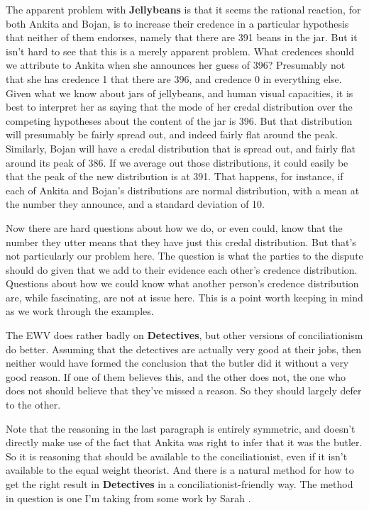 The apparent problem with \textbf{Jellybeans} is that it seems the rational reaction, for both \gls{Ankita} and \gls{Bojan}, is to increase their credence in a particular hypothesis that neither of them endorses, namely that there are 391 beans in the jar. But it isn't hard to see that this is a merely apparent problem. What credences should we attribute to \gls{Ankita} when she announces her guess of 396? Presumably not that she has credence 1 that there are 396, and credence 0 in everything else. Given what we know about jars of jellybeans, and human visual capacities, it is best to interpret her as saying that the mode of her credal distribution over the competing hypotheses about the content of the jar is 396. But that distribution will presumably be fairly spread out, and indeed fairly flat around the peak. Similarly, \gls{Bojan} will have a credal distribution that is spread out, and fairly flat around its peak of 386. If we average out those distributions, it could easily be that the peak of the new distribution is at 391. That happens, for instance, if each of \gls{Ankita} and \gls{Bojan}'s distributions are normal distribution, with a mean at the number they announce, and a standard deviation of 10.

Now there are hard questions about how we do, or even could, know that the number they utter means that they have just this credal distribution. But that's not particularly our problem here. The question is what the parties to the dispute should do given that we add to their evidence each other's credence distribution. Questions about how we could know what another person's credence distribution are, while fascinating, are not at issue here. This is a point worth keeping in mind as we work through the examples.

The EWV does rather badly on \textbf{Detectives}, but other versions of conciliationism do better. Assuming that the detectives are actually very good at their jobs, then neither would have formed the conclusion that the butler did it without a very good reason. If one of them believes this, and the other does not, the one who does not should believe that they've missed a reason. So they should largely defer to the other.

Note that the reasoning in the last paragraph is entirely symmetric, and doesn't directly make use of the fact that \gls{Ankita} was right to infer that it was the butler. So it is reasoning that should be available to the conciliationist, even if it isn't available to the equal weight theorist. And there is a natural method for how to get the right result in \textbf{Detectives} in a conciliationist-friendly way. The method in question is one I'm taking from some work by Sarah \citet{Moss2011}.

